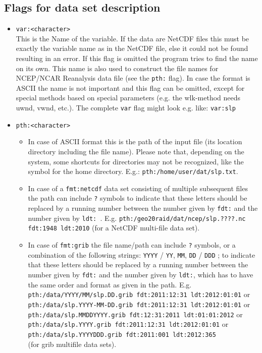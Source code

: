 \documentclass[12pt, oneside, a4paper, headsepline, plainheadsepline]{scrbook}
\begin{document}
\subsection{Flags for data set description}
\begin{itemize}
\item \verb+var:<character>+ \\
        This is the Name of the variable. If the data are NetCDF
        files this must be exactly the variable name as in the
        NetCDF file, else it could not be found resulting in an
        error. If this flag is omitted the program tries to find the name on its own. 
        This name is also used to construct the file names
        for NCEP/NCAR Reanalysis data file (see the \verb+pth:+ flag).
        In case the format is ASCII the name is not important
        and this flag can be omitted, except for special methods based on
		special parameters (e.g. the wlk-method needs uwnd, vwnd, etc.).
        The complete \verb+var+ flag might look e.g. like: \verb+var:slp+
        
\item \verb+pth:<character>+ \\
        \begin{itemize}
        \item In case of ASCII format this is the path of the input file (its location directory including the file name). Please note that, depending on the system, some shortcuts for directories may not be recognized, like the ~ symbol for the home directory.
        E.g.: \verb+pth:/home/user/dat/slp.txt+.
        \item In case of a \verb+fmt:netcdf+ data set consisting of multiple subsequent files 
        the path can include \verb+?+ symbols
        to indicate that these letters should be replaced by a running number between
        the number given by \verb+fdt:+ and the number given by \verb+ldt: +.
        E.g. \verb+pth:/geo20raid/dat/ncep/slp.????.nc fdt:1948 ldt:2010+ (for a NetCDF multi-file data set).
        \item In case of \verb+fmt:grib+ the file name/path can include \verb+?+ symbols,
        or a combination of the following strings: \verb+YYYY+ / \verb+YY+, \verb+MM+, \verb+DD+ / \verb+DDD+
        ; to indicate that these letters should be replaced by a running number between
        the number given by \verb+fdt:+ and the number given by \verb+ldt:+,
        which has to have the same order and format as given in the path.
        E.g. \verb+pth:/data/YYYY/MM/slp.DD.grib fdt:2011:12:31 ldt:2012:01:01+ or \\
        \verb+pth:/data/slp.YYYY-MM-DD.grib fdt:2011:12:31 ldt:2012:01:01+ or \\
        \verb+pth:/data/slp.MMDDYYYY.grib fdt:12:31:2011 ldt:01:01:2012+ or \\
        \verb+pth:/data/slp.YYYY.grib fdt:2011:12:31 ldt:2012:01:01+ or \\
        \verb+pth:/data/slp.YYYYDDD.grib fdt:2011:001 ldt:2012:365+ \\
        (for grib multifile data sets).
        \end{itemize}


\end{itemize}
\end{document}
